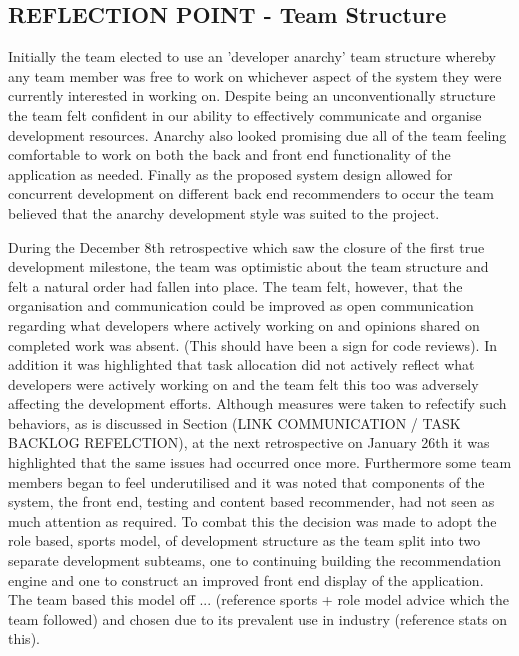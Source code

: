 \documentclass{l3proj}
\begin{document}
\subsection{REFLECTION POINT - Team Structure}
\label{sec:teamstructure}



Initially the team elected to use an 'developer anarchy' team structure whereby any team member was free to work on whichever aspect of the system they were currently interested in working on. Despite being an unconventionally structure the team felt confident in our ability to effectively communicate and organise development resources. Anarchy also looked promising due all of the team feeling comfortable to work on both the back and front end functionality of the application as needed. Finally as the proposed system design allowed for concurrent development on different back end recommenders to occur the team believed that the anarchy development style was suited to the project.

During the December 8th retrospective which saw the closure of the first true development milestone, the team was optimistic about the team structure and felt a natural order had fallen into place. The team felt, however, that the organisation and communication could be improved as open communication regarding what developers where actively working on and opinions shared on completed work was absent. (This should have been a sign for code reviews). In addition it was highlighted that task allocation did not actively reflect what developers were actively working on and the team felt this too was adversely affecting the development efforts. Although measures were taken to refectify such behaviors, as is discussed in Section (LINK COMMUNICATION / TASK BACKLOG REFELCTION), at the next retrospective on January 26th it was highlighted that the same issues had occurred once more. Furthermore some team members began to feel underutilised and it was noted that components of the system, the front end, testing and content based recommender, had not seen as much attention as required. To combat this the decision was made to adopt the role based, sports model, of development structure as the team split into two separate development subteams, one to continuing building the recommendation engine and one to construct an improved front end display of the application. The team based this model off ... (reference sports + role model advice which the team followed) and chosen due to its prevalent use in industry (reference stats on this).
\end{document}
